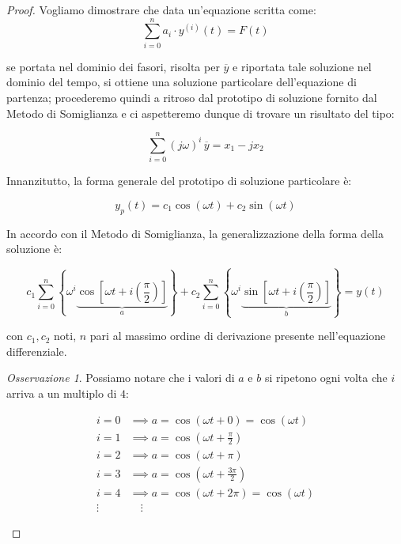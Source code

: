 \documentclass[11pt,italian]{article}
\theoremstyle{remark}
\newtheorem*{mdproposition}{Osservazione}
\newenvironment{remark}%
	{\begin{mdframed}[backgroundcolor=White]\begin{mdproposition}}%
	{\end{mdproposition}\end{mdframed}}
\begin{document}
\begin{proof}
    Vogliamo dimostrare che data un'equazione scritta come:
    \[
        \sum_{i=0}^{n} a_i \cdot y^{(i)}(t) = F(t)
    \]

    se portata nel dominio dei fasori, risolta per $\overline{y}$ e riportata tale soluzione nel dominio del tempo, si ottiene una soluzione particolare dell'equazione di partenza; procederemo quindi a ritroso dal prototipo di soluzione fornito dal Metodo di Somiglianza e ci aspetteremo dunque di trovare un risultato del tipo:

    \begin{equation}
        \sum_{i=0}^n (j \omega)^i\, \overline{y} = x_1 - j x_2
    \end{equation}

    \vspace{1em}

    Innanzitutto, la forma generale del prototipo di soluzione particolare è:

    \[
        y_p(t) = c_1 \cos (\omega t) + c_2 \sin (\omega t)
    \]

    In accordo con il Metodo di Somiglianza, la generalizzazione della forma della soluzione è:

    \begin{equation}
        c_1 \sum_{i=0} ^ n \left\{ \omega^i \underbrace{\cos \left[ \omega t + i \left( \frac{\pi}{2} \right) \right]}_{a} \right\} + c_2 \sum_{i=0} ^ n \left\{ \omega^i \underbrace{\sin \left[ \omega t + i \left( \frac{\pi}{2} \right) \right]}_{b} \right\} = y(t)
    \end{equation}

    con \(c_1, c_2\) noti, \(n\) pari al massimo ordine di derivazione presente nell'equazione differenziale.


    \begin{remark}
        Possiamo notare che i valori di \(a\) e \(b\) si ripetono ogni volta che \(i\) arriva a un multiplo di \(4\):

        \begin{align*}
            i = 0  & \implies a = \cos (\omega t + 0) = \cos (\omega t)    \\
            i = 1  & \implies a = \cos (\omega t + \frac{\pi}{2})          \\
            i = 2  & \implies a = \cos (\omega t + \pi)                    \\
            i = 3  & \implies a = \cos (\omega t + \frac{3\pi}{2})         \\
            i = 4  & \implies a = \cos (\omega t + 2\pi) = \cos (\omega t) \\
            \vdots & \quad \vdots
        \end{align*}


\end{remark}
\end{proof}
\end{document}
